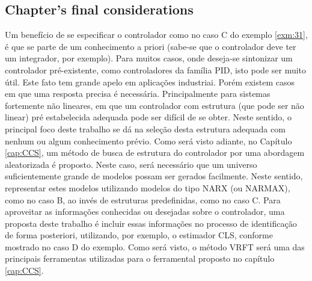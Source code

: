 \subsection{ Chapter's final considerations }%
\label{sub:considerações_finais}
%
   Um benefício de se especificar o controlador como no caso C do exemplo \ref{exm:31},  é que se parte de um conhecimento a priori (sabe-se que o controlador deve ter um integrador, por exemplo). Para muitos casos, onde deseja-se sintonizar um controlador pré-existente, como controladores da família PID, isto pode ser muito útil. Este fato tem grande apelo em aplicações industriai.
%
   Porém existem casos em que uma resposta precisa é necessária. Principalmente para sistemas fortemente não lineares, em que um controlador com estrutura (que pode ser não linear) pré estabelecida  adequada pode ser difícil de se obter.
   Neste sentido, o principal foco deste trabalho se dá na seleção desta estrutura adequada com nenhum ou algum conhecimento prévio. Como será visto adiante, no Capítulo \ref{cap:CCS}, um método de busca de estrutura do controlador por uma abordagem aleatorizada é proposto.
   Neste caso, será necessário que um universo suficientemente grande de modelos possam ser gerados facilmente.
   Neste sentido, representar estes modelos utilizando modelos do tipo NARX (ou NARMAX), como no caso B, ao invés de estruturas predefinidas, como no caso C.
   Para aproveitar as informações conhecidas ou desejadas sobre o controlador, uma proposta deste trabalho é incluir essas informações no processo de identificação de forma posteriori, utilizando, por exemplo, o estimador CLS, conforme mostrado no caso D do exemplo.
%
   Como será visto, o método VRFT será uma das principais ferramentas utilizadas para o ferramental proposto no capítulo \ref{cap:CCS}.

